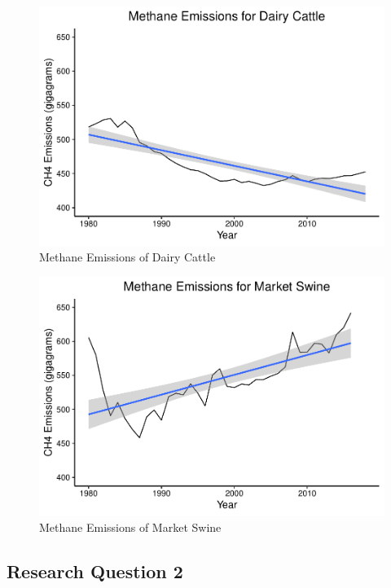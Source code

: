 \documentclass[
  12pt,
]{article}
\begin{document}
\begin{figure}
\centering
\includegraphics{Methane_Project_Template_files/figure-latex/dairy.cattle.ts-1.pdf}
\caption{Methane Emissions of Dairy Cattle}
\end{figure}

\begin{figure}
\centering
\includegraphics{Methane_Project_Template_files/figure-latex/market.swine.ts-1.pdf}
\caption{Methane Emissions of Market Swine}
\end{figure}

\hypertarget{research-question-2}{%
\subsection{Research Question 2}\label{research-question-2}}
\end{document}
